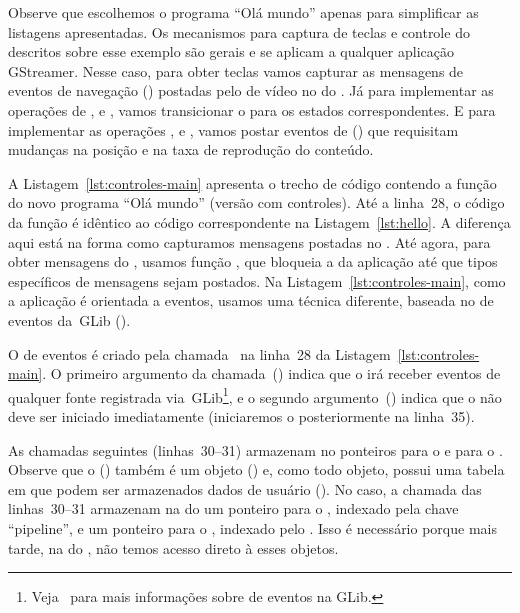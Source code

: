 \documentclass{SBCbookchapter}
\begin{document}
Observe que escolhemos o programa ``Olá mundo'' apenas para simplificar as
listagens apresentadas.  Os mecanismos para captura de teclas e controle do
 descritos sobre esse exemplo são gerais e se aplicam a
qualquer aplicação GStreamer.  Nesse caso, para obter teclas vamos capturar
as mensagens de eventos de navegação ()
postadas pelo  de vídeo no  do .  Já para
implementar as operações de ,  e , vamos
transicionar o  para os estados correspondentes.  E para
implementar as operações ,  e , vamos
postar eventos de  () que requisitam mudanças na
posição e na taxa de reprodução do conteúdo.

A Listagem~\ref{lst:controles-main} apresenta o trecho de código contendo a
função  do novo programa ``Olá mundo'' (versão com controles).  Até
a linha~28, o código da função é idêntico ao código correspondente na
Listagem~\ref{lst:hello}.  A diferença aqui está na forma como capturamos
mensagens postadas no .  Até agora, para obter mensagens do
, usamos função , que bloqueia a
 da aplicação até que tipos específicos de mensagens sejam
postados.  Na Listagem~\ref{lst:controles-main}, como a aplicação é
orientada a eventos, usamos uma técnica diferente, baseada no  de
eventos da~GLib ().

O  de eventos é criado pela chamada~ na linha~28
da Listagem~\ref{lst:controles-main}.  O primeiro argumento da
chamada~() indica que o  irá receber eventos de qualquer
fonte registrada via~GLib\footnote{Veja~\cite{glib} para mais informações
  sobre  de eventos na GLib.}, e o segundo argumento~()
indica que o  não deve ser iniciado imediatamente (iniciaremos o
 posteriormente na linha~35).

As chamadas  seguintes (linhas~30--31) armazenam no
 ponteiros para o  e para o .  Observe que o
 () também é um objeto () e, como todo objeto,
possui uma tabela  em que podem ser armazenados dados de usuário
().  No caso, a chamada das linhas~30--31 armazenam na
 do  um ponteiro para o , indexado pela chave
``pipeline'', e um ponteiro para o , indexado pelo .  Isso
é necessário porque mais tarde, na  do , não temos
acesso direto à esses objetos.
\end{document}
